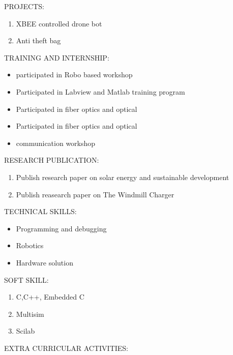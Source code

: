 \documentclass[11pt,a4paper]{article}
\begin{document}
\begin{flushleft}
		\textsf{PROJECTS:}\\
		\begin{enumerate}
			\item  XBEE controlled drone bot
			\item  Anti theft bag
		\end{enumerate}
			\textsf{TRAINING AND INTERNSHIP:}\\
			\begin{itemize}
				\item  participated in Robo based workshop\\
				\item  Participated in Labview and Matlab training program\\
				\item  Participated in fiber optics and optical\\
				\item  Participated in fiber optics and optical\\
				\item communication workshop
			\end{itemize}
				\textsf{RESEARCH PUBLICATION:}
				\begin{enumerate}
					\item Publish research paper on solar energy and sustainable development\\ 
					\item Publish reasearch paper on The Windmill Charger\\ 
				\end{enumerate} 
			\textsf{TECHNICAL SKILLS:}\\
			\begin{itemize}
				\item Programming and debugging\\
				\item Robotics \\
				\item Hardware solution\\
			\end{itemize}
				\textsf{SOFT SKILL:}\\
				\begin{enumerate}
					\item C,C++, Embedded C\\
					\item Multisim\\
					\item Scilab\\
	          \end{enumerate}
	          \textsf{EXTRA CURRICULAR ACTIVITIES:}\\
	          

\end{flushleft}
\end{document}
